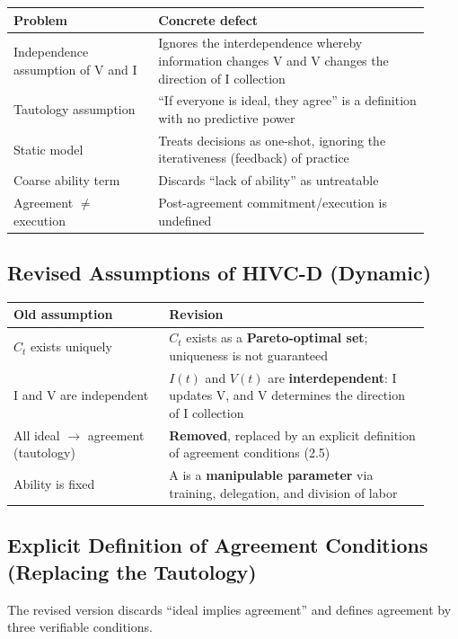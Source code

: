\documentclass[11pt]{article}
\newcommand{\Ct}{\ensuremath{C_t}}
\begin{document}
\begin{longtable}{@{}p{0.32\linewidth} p{0.60\linewidth}@{}}
\toprule
Problem & Concrete defect \\
\midrule
Independence assumption of V and I & Ignores the interdependence whereby information changes V and V changes the direction of I collection \\
Tautology assumption & ``If everyone is ideal, they agree'' is a definition with no predictive power \\
Static model & Treats decisions as one-shot, ignoring the iterativeness (feedback) of practice \\
Coarse ability term & Discards ``lack of ability'' as untreatable \\
Agreement $\neq$ execution & Post-agreement commitment/execution is undefined \\
\bottomrule
\end{longtable}

\subsection{Revised Assumptions of HIVC-D (Dynamic)}

\begin{longtable}{@{}p{0.34\linewidth} p{0.58\linewidth}@{}}
\toprule
Old assumption & Revision \\
\midrule
\Ct{} exists uniquely & \Ct{} exists as a \textbf{Pareto-optimal set}; uniqueness is not guaranteed \\
I and V are independent & $I(t)$ and $V(t)$ are \textbf{interdependent}: I updates V, and V determines the direction of I collection \\
All ideal $\to$ agreement (tautology) & \textbf{Removed}, replaced by an explicit definition of agreement conditions (2.5) \\
Ability is fixed & A is a \textbf{manipulable parameter} via training, delegation, and division of labor \\
\bottomrule
\end{longtable}

\subsection{Explicit Definition of Agreement Conditions (Replacing the Tautology)}

The revised version discards ``ideal implies agreement'' and defines agreement by three verifiable conditions.
\end{document}
